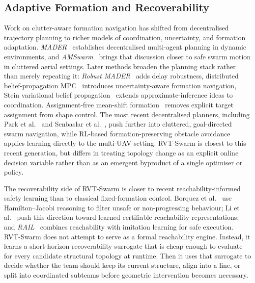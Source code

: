 \documentclass{ieeeaccess}
\begin{document}
\subsection{Adaptive Formation and Recoverability}
Work on clutter-aware formation navigation has shifted from decentralised trajectory planning to richer models of coordination, uncertainty, and formation adaptation. \emph{MADER}~\cite{tordesillas2022mader} establishes decentralised multi-agent planning in dynamic environments, and \emph{AMSwarm}~\cite{adajania2023amswarm} brings that discussion closer to safe swarm motion in cluttered aerial settings. Later methods broaden the planning stack rather than merely repeating it: \emph{Robust MADER}~\cite{kondo2024robust_mader} adds delay robustness, distributed belief-propagation MPC~\cite{jiang2024belief_mpc_formation} introduces uncertainty-aware formation navigation, Stein variational belief propagation~\cite{pavlasek2024stein_belief} extends approximate-inference ideas to coordination. Assignment-free mean-shift formation~\cite{zhang2024mean_shift_shape} removes explicit target assignment from shape control. The most recent decentralised planners, including Park et al.~\cite{park2025goal_convergence} and Senbaslar et al.~\cite{senbaslar2025dream}, push further into cluttered, goal-directed swarm navigation, while RL-based formation-preserving obstacle avoidance~\cite{xie2025multi_uav_formation_rl} applies learning directly to the multi-UAV setting. RVT-Swarm is closest to this recent generation, but differs in treating topology change as an explicit online decision variable rather than as an emergent byproduct of a single optimiser or policy.

The recoverability side of RVT-Swarm is closer to recent reachability-informed safety learning than to classical fixed-formation control. Borquez et al.~\cite{borquez2024hj_filtering} use Hamilton--Jacobi reasoning to filter unsafe or non-progressing behaviour; Li et al.~\cite{li2025certifiable_reachability} push this direction toward learned certifiable reachability representations; and \emph{RAIL}~\cite{jung2025rail} combines reachability with imitation learning for safe execution. RVT-Swarm does not attempt to serve as a formal reachability engine. Instead, it learns a short-horizon recoverability surrogate that is cheap enough to evaluate for every candidate structural topology at runtime. Then it uses that surrogate to decide whether the team should keep its current structure, align into a line, or split into coordinated subteams before geometric intervention becomes necessary.
\end{document}
